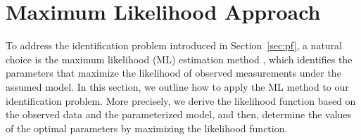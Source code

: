 \section{Maximum Likelihood Approach}\label{sec:ML}

To address the identification problem introduced in Section~\ref{sec:pf}, a natural choice is the maximum likelihood (ML) estimation method \cite{lehmann2006theory}, which identifies the parameters that maximize the likelihood of observed measurements under the assumed model. 
In this section, we outline how to apply the ML method to our identification problem.
More precisely, we derive the likelihood function based on the observed data and the parameterized model, and then, determine the values of the optimal parameters by maximizing the likelihood function. 

